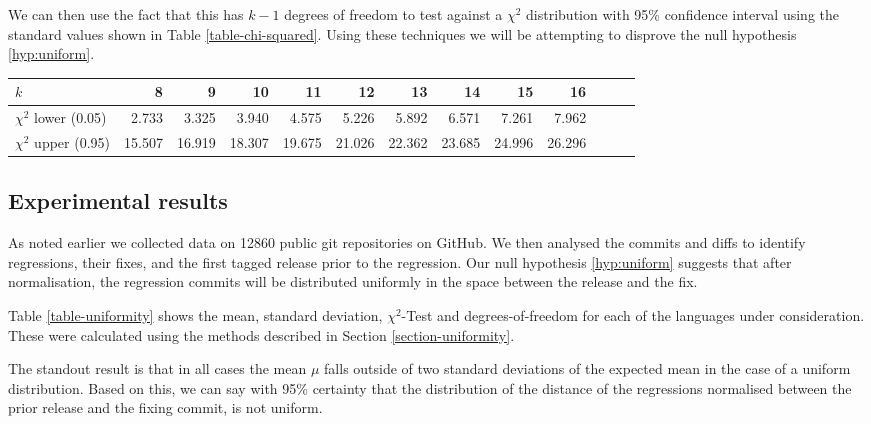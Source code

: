 \documentclass[10pt,journal,compsoc]{IEEEtran}
\begin{document}
We can then use the fact that this has $k - 1$ degrees of freedom to test against a $\chi^2$ distribution with 95\% confidence interval using the standard values shown in Table \ref{table-chi-squared}. Using these techniques we will be attempting to disprove the null hypothesis \ref{hyp:uniform}.

\begin{table*}[t!]
\begin{center}
\begin{tabular}{l r r r r r r r r r r r r} \hline
$k$ & 8 & 9 & 10 & 11 & 12 & 13 & 14 & 15 & 16 \\ \hline
$\chi^2$ lower (0.05) & 2.733 & 3.325 & 3.940 & 4.575 & 5.226 & 5.892 & 6.571 & 7.261 & 7.962 \\
$\chi^2$ upper (0.95) & 15.507 & 16.919 & 18.307 & 19.675 & 21.026 & 22.362 & 23.685 & 24.996 & 26.296 \\ \hline
\end{tabular}
\caption{\label{table-chi-squared}$\chi^2$ distribution values for 95\% confidence.}
\end{center}
\end{table*}

\subsection{Experimental results}

As noted earlier we collected data on 12860 public git repositories on GitHub. We then analysed the commits and diffs to identify regressions, their fixes, and the first tagged release prior to the regression. Our null hypothesis \ref{hyp:uniform} suggests that after normalisation, the regression commits will be distributed uniformly in the space between the release and the fix.

Table \ref{table-uniformity} shows the mean, standard deviation, $\chi^2$-Test and degrees-of-freedom for each of the languages under consideration. These were calculated using the methods described in Section \ref{section-uniformity}.

The standout result is that in all cases the mean $\mu$ falls outside of two standard deviations of the expected mean in the case of a uniform distribution. Based on this, we can say with 95\% certainty that the distribution of the distance of the regressions normalised between the prior release and the fixing commit, is not uniform.
\end{document}
